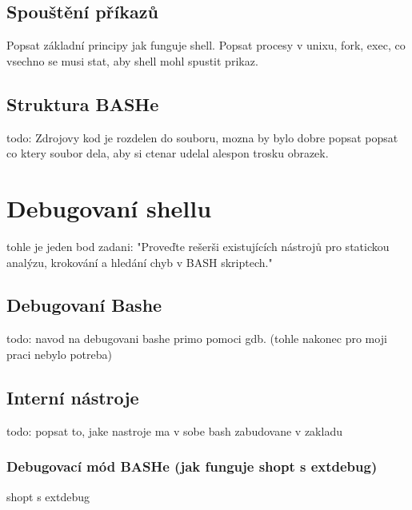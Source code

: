 \documentclass[thesis=M,czech]{FITthesis}[2012/06/26]
\begin{document}


\subsection{Spouštění příkazů}
Popsat základní principy jak funguje shell. Popsat procesy v unixu, fork, exec, co vsechno se musi stat, aby shell mohl spustit prikaz.

\subsection{Struktura BASHe}
todo: Zdrojovy kod je rozdelen do souboru, mozna by bylo dobre popsat popsat co ktery soubor dela, aby si ctenar udelal alespon trosku obrazek.



\section{Debugovaní shellu} %

tohle je jeden bod zadani: "Proveďte rešerši existujících nástrojů pro statickou analýzu, krokování a hledání chyb v BASH skriptech."

\subsection{Debugovaní Bashe}
todo: navod na debugovani bashe primo pomoci gdb. (tohle nakonec pro moji praci nebylo potreba) 

\subsection{Interní nástroje}

todo: popsat to, jake nastroje ma v sobe bash zabudovane v zakladu

\subsubsection{Debugovací mód BASHe (jak funguje shopt s extdebug)}
shopt s extdebug
\end{document}
